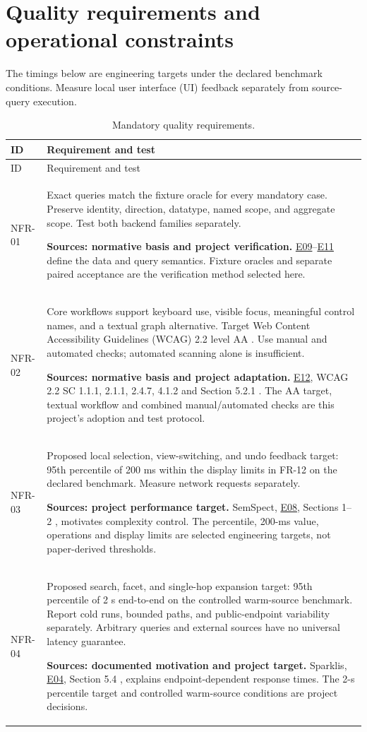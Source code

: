 \documentclass[11pt,a4paper]{article}
\newcommand{\evidence}[1]{\hyperlink{evidence:#1}{#1}}
\begin{document}
\section{Quality requirements and operational constraints}
The timings below are engineering targets under the declared benchmark conditions. Measure local user interface (UI) feedback separately from source-query execution.

{\small
\begin{longtable}{@{}P{1.35cm}P{14.35cm}@{}}
\caption{Mandatory quality requirements.}\label{tab:nfr}\\
\toprule ID & Requirement and test\\\midrule
\endfirsthead\toprule ID & Requirement and test\\\midrule\endhead
\bottomrule\endlastfoot
NFR-01 & Exact queries match the fixture oracle for every mandatory case. Preserve identity, direction, datatype, named scope, and aggregate scope. Test both backend families separately.\par\smallskip \textbf{Sources: normative basis and project verification.} \evidence{E09}--\evidence{E11} \citep{rdfconcepts,sparql,opencypher} define the data and query semantics. Fixture oracles and separate paired acceptance are the verification method selected here.\\
NFR-02 & Core workflows support keyboard use, visible focus, meaningful control names, and a textual graph alternative. Target Web Content Accessibility Guidelines (WCAG) 2.2 level AA \citep{wcag}. Use manual and automated checks; automated scanning alone is insufficient.\par\smallskip \textbf{Sources: normative basis and project adaptation.} \evidence{E12}, WCAG 2.2 SC 1.1.1, 2.1.1, 2.4.7, 4.1.2 and Section 5.2.1 \citep{wcag}. The AA target, textual workflow and combined manual/automated checks are this project's adoption and test protocol.\\
NFR-03 & Proposed local selection, view-switching, and undo feedback target: 95th percentile of 200 ms within the display limits in FR-12 on the declared benchmark. Measure network requests separately.\par\smallskip \textbf{Sources: project performance target.} SemSpect, \evidence{E08}, Sections 1--2 \citep{semspect}, motivates complexity control. The percentile, 200-ms value, operations and display limits are selected engineering targets, not paper-derived thresholds.\\
NFR-04 & Proposed search, facet, and single-hop expansion target: 95th percentile of 2 s end-to-end on the controlled warm-source benchmark. Report cold runs, bounded paths, and public-endpoint variability separately. Arbitrary queries and external sources have no universal latency guarantee.\par\smallskip \textbf{Sources: documented motivation and project target.} Sparklis, \evidence{E04}, Section 5.4 \citep{sparklis}, explains endpoint-dependent response times. The 2-s percentile target and controlled warm-source conditions are project decisions.\\

\end{longtable}}
\end{document}

